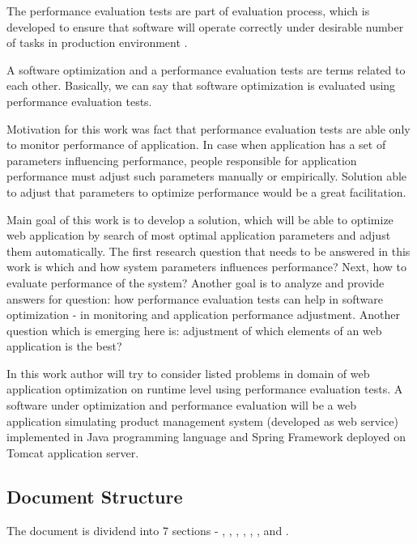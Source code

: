 \documentclass[12pt,a4paper]{article}
\begin{document}
The performance evaluation tests are part of evaluation process, which is developed to ensure that software will operate correctly under desirable number of tasks in production environment \cite{analysisofpet}.   

A software optimization and a performance evaluation tests are terms related to each other. Basically, we can say that software optimization is evaluated using performance evaluation tests. 

Motivation for this work was fact that performance evaluation tests are able only to monitor performance of application. In case when application has a set of parameters influencing performance, people responsible for application performance must adjust such parameters manually or empirically. Solution able to adjust that parameters to optimize performance would be a great facilitation. 

Main goal of this work is to develop a solution, which will be able to optimize web application by search of most optimal application parameters and adjust them automatically. The first research question that needs to be answered in this work is which and how system parameters influences performance? Next, how to evaluate performance of the system? Another goal is to analyze and provide answers for question: how performance evaluation tests can help in software optimization - in monitoring and application performance adjustment. Another question which is emerging here is: adjustment of which elements of an web application is the best? 

In this work author will try to consider listed problems in domain of web application optimization on runtime level using performance evaluation tests. A software under optimization and performance evaluation will be a web application simulating product management system (developed as web service) implemented in Java programming language and Spring Framework deployed on Tomcat application server. 

\pagebreak
\subsection{Document Structure}

The document is dividend into 7 sections - 
\textit{}, 
\textit{}, 
\textit{}, 
\textit{}, 
\textit{}, 
\textit{}, 
\textit{} and 
\textit{}. 
\end{document}
